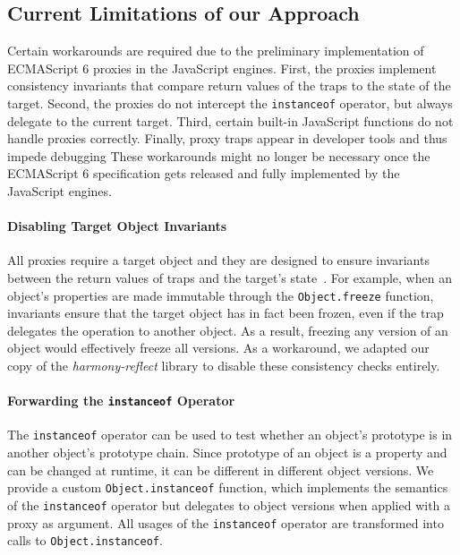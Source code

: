 \subsection{Current Limitations of our Approach} \label{sec:IMPLEMENTATION:4}

Certain workarounds are required due to the preliminary implementation of ECMAScript 6 proxies in the JavaScript engines.
First, the proxies implement consistency invariants that compare return values of the traps to the state of the target.
Second, the proxies do not intercept the \lstinline{instanceof} operator, but always delegate to the current target.
Third, certain built-in JavaScript functions do not handle proxies correctly.
Finally, proxy traps appear in developer tools and thus impede debugging
These workarounds might no longer be necessary once the ECMAScript 6 specification gets released and fully implemented by the JavaScript engines.

\paragraph{Disabling Target Object Invariants}
All proxies require a target object and they are designed to ensure invariants between the return values of traps and the target's state~\cite{Cutsem2013TRP}.
For example, when an object's properties are made immutable through the \lstinline{Object.freeze} function, invariants ensure that the target object has in fact been frozen, even if the trap delegates the operation to another object.
As a result, freezing any version of an object would effectively freeze all versions.
As a workaround, we adapted our copy of the \emph{harmony-reflect} library to disable these consistency checks entirely.

\paragraph{Forwarding the \lstinline{instanceof} Operator}
The \lstinline{instanceof} operator can be used to test whether an object's prototype is in another object's prototype chain.
Since prototype of an object is a property and can be changed at runtime, it can be different in different object versions.
We provide a custom \lstinline{Object.instanceof} function, which implements the semantics of the \lstinline{instanceof} operator but delegates to object versions when applied with a proxy as argument.
All usages of the \lstinline{instanceof} operator are transformed into calls to \lstinline{Object.instanceof}.

